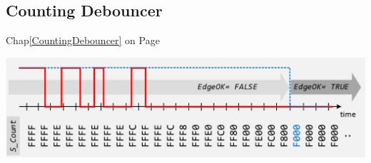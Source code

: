 \begin{minipage}{0.5\linewidth}
    \subsection{Counting Debouncer }
    Chap\ref{CountingDebouncer} on Page \pageref{CountingDebouncer}
\end{minipage}
\begin{minipage}{0.5\linewidth}
    \includegraphics[width=0.9\linewidth]{images/CountingDebouncerTiming}
\end{minipage}


\clearpage